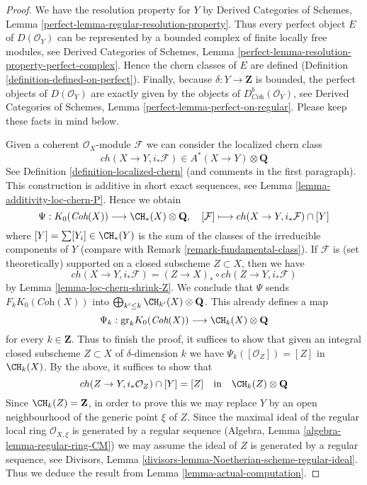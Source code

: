 \begin{proof}
We have the resolution property for $Y$ by Derived Categories of Schemes, Lemma
\ref{perfect-lemma-regular-resolution-property}. Thus every perfect object
$E$ of $D(\mathcal{O}_Y)$ can be represented by a bounded complex of finite
locally free modules, see Derived Categories of Schemes, Lemma
\ref{perfect-lemma-resolution-property-perfect-complex}. Hence the chern
classes of $E$ are defined (Definition \ref{definition-defined-on-perfect}).
Finally, because $\delta : Y \to \mathbf{Z}$ is bounded,
the perfect objects of $D(\mathcal{O}_Y)$ are exactly given by the objects of
$D^b_{\textit{Coh}}(\mathcal{O}_Y)$, see
Derived Categories of Schemes, Lemma \ref{perfect-lemma-perfect-on-regular}.
Please keep these facts in mind below.

\medskip\noindent
Given a coherent $\mathcal{O}_X$-module $\mathcal{F}$ we can
consider the localized chern class
$$
ch(X \to Y, i_*\mathcal{F}) \in A^*(X \to Y) \otimes \mathbf{Q}
$$
See Definition \ref{definition-localized-chern}
(and comments in the first paragraph).
This construction is additive in short exact sequences, see
Lemma \ref{lemma-additivity-loc-chern-P}. Hence we obtain
$$
\Psi : K_0(\textit{Coh}(X)) \longrightarrow \CH_*(X) \otimes \mathbf{Q},\quad
[\mathcal{F}] \longmapsto ch(X \to Y, i_*\mathcal{F}) \cap [Y]
$$
where $[Y] = \sum [Y_i] \in \CH_*(Y)$ is the sum of the classes of the
irreducible components of $Y$ (compare with
Remark \ref{remark-fundamental-class}).
If $\mathcal{F}$ is (set theoretically) supported on a closed subscheme
$Z \subset X$, then we have
$$
ch(X \to Y, i_*\mathcal{F}) = (Z \to X)_* \circ ch(Z \to Y, i_*\mathcal{F})
$$
by Lemma \ref{lemma-loc-chern-shrink-Z}. We conclude that
$\Psi$ sends $F_kK_0(\textit{Coh}(X))$ into
$\bigoplus_{k' \leq k} \CH_{k'}(X) \otimes \mathbf{Q}$.
This already defines a map
$$
\Psi_k :
\text{gr}_k K_0(\textit{Coh}(X))
\longrightarrow
\CH_k(X) \otimes \mathbf{Q}
$$
for every $k \in \mathbf{Z}$. Thus to finish the proof, it suffices to show
that given an integral closed subscheme $Z \subset X$ of $\delta$-dimension $k$
we have $\Psi_k([\mathcal{O}_Z]) = [Z]$ in $\CH_k(X)$. By the
above, it suffices to show that
$$
ch(Z \to Y, i_*\mathcal{O}_Z) \cap [Y] = [Z]
\quad\text{in}\quad
\CH_k(Z) \otimes \mathbf{Q}
$$
Since $\CH_k(Z) = \mathbf{Z}$, in order to prove this we may replace $Y$
by an open neighbourhood of the generic point $\xi$ of $Z$. Since the maximal
ideal of the regular local ring $\mathcal{O}_{X, \xi}$ is generated by a
regular sequence (Algebra, Lemma \ref{algebra-lemma-regular-ring-CM})
we may assume the ideal of $Z$ is generated by a regular sequence, see
Divisors, Lemma \ref{divisors-lemma-Noetherian-scheme-regular-ideal}.
Thus we deduce the result from Lemma \ref{lemma-actual-computation}.
\end{proof}

